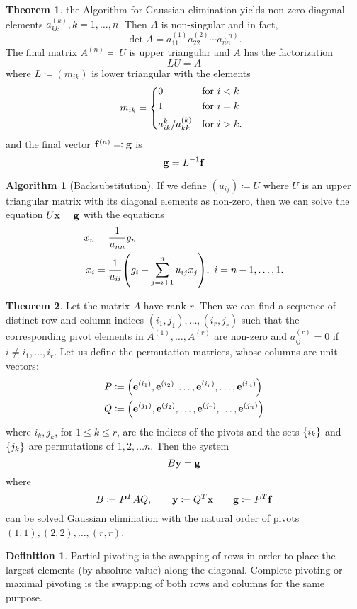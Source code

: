 \documentclass[11pt,letterpaper]{article}
\numberwithin{figure}{section} %
\newcommand{\inv}[1]{#1^{-1}}
\newcommand{\keyword}[1]{\colorbox{cyan!20!}{#1}}
\theoremstyle{definition}
\newtheorem{theorem}{Theorem}[subsection]
\theoremstyle{definition}
\theoremstyle{definition}
\theoremstyle{definition}
\newtheorem{definition}{Definition}[subsection]
\theoremstyle{definition}
\theoremstyle{remark}
\theoremstyle{remark}
\theoremstyle{definition}
\newtheorem*{algorithm}{Algorithm}
\theoremstyle{remark}
\theoremstyle{remark}
\begin{document}
\begin{multicols*}{3}
\begin{theorem}
	the Algorithm for Gaussian elimination yields non-zero diagonal elements
	$a_{kk}^{(k)}, k = 1, \dots, n$. Then $A$ is non-singular and in fact,
	\[
		\det A = a_{11}^{(1)}a_{22}^{(2)} \cdots a_{nn}^{(n)}.
	\]
	The final matrix $A^{(n)} \eqqcolon U$ is upper triangular and $A$ has the
	factorization
	\[
		LU = A
	\]
	where $L \coloneqq (m_{ik})$ is lower triangular with the elements
	\[
		m_{ik} =
		\begin{cases*}
			0 & for $i < k$ \\
			1 & for $i = k$ \\
			a_{ik}^{k} / a_{kk}^{(k)} & for $i > k$.
		\end{cases*}
	\]
	and the final vector $\vb{f}^{(n)} \eqqcolon \vb{g}$ is 
	\[
		\vb{g} = \inv{L} \vb{f}
	\]
\end{theorem}
\begin{algorithm}[Backsubstitution]
	If we define $(u_{ij}) \coloneqq U$ where $U$ is an upper triangular matrix
	with its diagonal elements as non-zero, then we can solve the equation
	$U\vb{x} = \vb{g}$ with the equations
	\begin{align*}
		x_n &= \frac{1}{u_{nn}}g_n \\
		x_i &= \frac{1}{u_{ii}}\pqty{g_i - \sum_{j = i + 1}^n u_{ij}x_j},~i = n-1, \ldots, 1.
	\end{align*}
\end{algorithm}
\begin{theorem}
	Let the matrix $A$ have rank $r$. Then we can find a sequence of distinct row
	and column indices $(i_1, j_1), \ldots, (i_r, j_r)$ such that the
	corresponding pivot elements in $A^{(1)}, \ldots, A^{(r)}$ are non-zero and
	$a_{ij}^{(r)} = 0$ if $i \neq i_1, \ldots, i_r$. Let us define the
	permutation matrices, whose columns are unit vectors:
	\begin{align*}
		P &\coloneqq \pqty{\vb{e}^{(i_1)}, \vb{e}^{(i_2)}, \ldots, \vb{e}^{(i_r)}, \ldots, \vb{e}^{(i_n)}} \\
		Q &\coloneqq \pqty{\vb{e}^{(j_1)}, \vb{e}^{(j_2)}, \ldots, \vb{e}^{(j_r)}, \ldots, \vb{e}^{(j_n)}}
	\end{align*}
	where $i_k, j_k$, for $1 \leq k \leq r$, are the indices of the pivots
	and the sets $\Bqty{i_k}$ and $\Bqty{j_k}$ are permutations of $1,2,\ldots n$.
	Then the system
	\[
		B\vb{y} = \vb{g}
	\]
	where
	\[
		B \coloneqq P^T A Q, \qquad \vb{y} \coloneqq Q^T \vb{x} \qquad \vb{g} \coloneqq P^T \vb{f}
	\]
	can be solved Gaussian elimination with the natural order of pivots $(1,1),
	(2,2), \ldots, (r,r)$.
\end{theorem}
\begin{definition}
	\keyword{Partial pivoting} is the swapping of rows in order to place the
	largest elements (by absolute value) along the diagonal. \keyword{Complete
	pivoting} or maximal pivoting is the swapping of both rows and columns for
	the same purpose.
\end{definition}

\end{multicols*}
\end{document}
